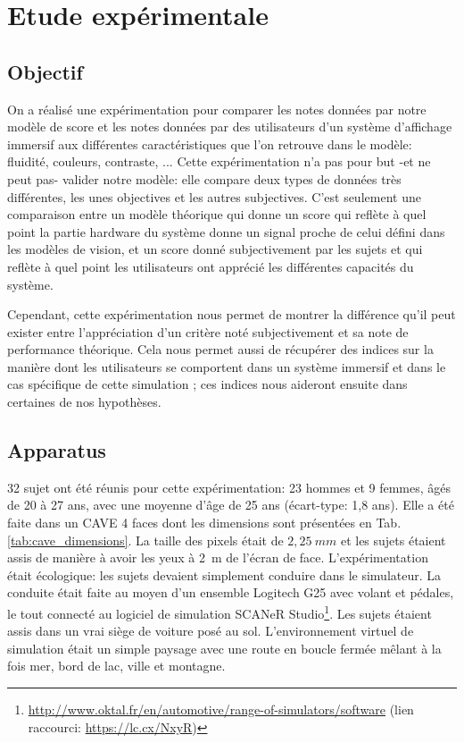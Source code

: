 \chapter{Etude expérimentale}
\label{chap:sdr_etude_experimentale}
	\section{Objectif}
		\par On a réalisé une expérimentation pour comparer les notes données par notre modèle de score et les notes données par des utilisateurs d'un système d'affichage immersif aux différentes caractéristiques que l'on retrouve dans le modèle: fluidité, couleurs, contraste, ... Cette expérimentation n'a pas pour but -et ne peut pas- valider notre modèle: elle compare deux types de données très différentes, les unes objectives et les autres subjectives. C'est seulement une comparaison entre un modèle théorique qui donne un score qui reflète à quel point la partie hardware du système donne un signal proche de celui défini dans les modèles de vision, et un score donné subjectivement par les sujets et qui reflète à quel point les utilisateurs ont apprécié les différentes capacités du système.
		
		\par Cependant, cette expérimentation nous permet de montrer la différence qu'il peut exister entre l'appréciation d'un critère noté subjectivement et sa note de performance théorique. Cela nous permet aussi de récupérer des indices sur la manière dont les utilisateurs se comportent dans un système immersif et dans le cas spécifique de cette simulation ; ces indices nous aideront ensuite dans certaines de nos hypothèses.
		
	\section{Apparatus}
	\par 32 sujet ont été réunis pour cette expérimentation: 23 hommes et 9 femmes, âgés de 20 à 27 ans, avec une moyenne d'âge de 25 ans (écart-type: 1,8 ans). Elle a été faite dans un CAVE 4 faces dont les dimensions sont présentées en Tab. \ref{tab:cave_dimensions}. La taille des pixels était de $2,25~mm$ et les sujets étaient assis de manière à avoir les yeux à 2~m de l'écran de face. L'expérimentation était écologique: les sujets devaient simplement conduire dans le simulateur. La conduite était faite au moyen d'un ensemble Logitech G25 avec volant et pédales, le tout connecté au logiciel de simulation SCANeR Studio\footnote{\url{http://www.oktal.fr/en/automotive/range-of-simulators/software} (lien raccourci: \url{https://lc.cx/NxyR})}. Les sujets étaient assis dans un vrai siège de voiture posé au sol. L'environnement virtuel de simulation était un simple paysage avec une route en boucle fermée mêlant à la fois mer, bord de lac, ville et montagne.
	 
